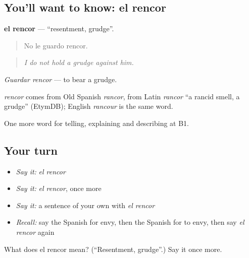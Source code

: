 \subsection*{You'll want to know: el rencor}
\textbf{el rencor} — \textquotedblleft{}resentment, grudge\textquotedblright{}.

\begin{quote}
No le guardo rencor.
\end{quote}

\begin{quote}
\emph{I do not hold a grudge against him.}
\end{quote}

\emph{Guardar rencor} — to bear a grudge.

\begin{cousinweb}
\emph{rencor} comes from Old Spanish \emph{rancor}, from Latin \emph{rancor} \textquotedblleft{}a rancid smell, a grudge\textquotedblright{} (EtymDB); English \emph{rancour} is the same word.
\end{cousinweb}

\begin{grammarlens}[title={What you've built}]
One more word for telling, explaining and describing at B1.
\end{grammarlens}

\subsection*{Your turn}
\begin{itemize}
\raggedright
  \item \emph{Say it:} \emph{el rencor}
  \item \emph{Say it:} \emph{el rencor}, once more
  \item \emph{Say it:} a sentence of your own with \emph{el rencor}
  \item \emph{Recall:} say the Spanish for envy, then the Spanish for to envy, then say \emph{el rencor} again
\end{itemize}

\begin{tcolorbox}[breakable,colback=teal!4,colframe=teal!35!black,title={Before you move on}]
What does el rencor mean? (\textquotedblleft{}Resentment, grudge\textquotedblright{}.) Say it once more.
\end{tcolorbox}
